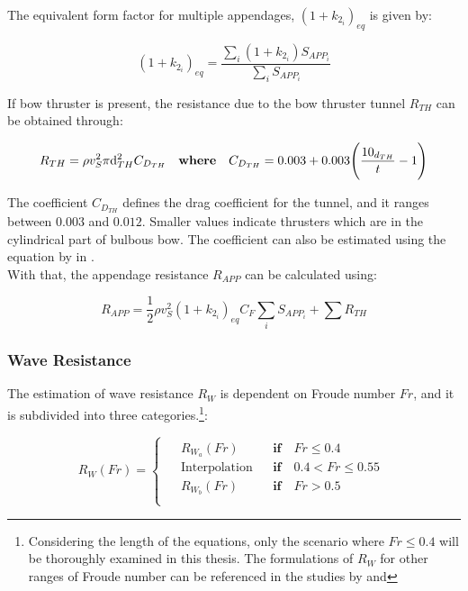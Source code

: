 The equivalent form factor for multiple appendages, $(1+k_{2_i})_{eq}$ is given by:

\begin{equation}\label{eqn:k2eq}
    (1+k_{2_i})_{eq} = \frac{\sum_i(1+k_{2_i})S_{APP_i}}{\sum_iS_{APP_i}}
\end{equation}

If bow thruster is present, the resistance due to the bow thruster tunnel $R_{TH}$ can be obtained through:

\begin{equation}\label{eqn:R_th}
    R_{TH} = \rho v_S^2 \pi \d_{TH}^2 C_{D_{TH}} \quad \textbf{where} \quad C_{D_{TH}} = 0.003 + 0.003 \Biggl( \frac{10_{d_{TH}}}{t} - 1 \Biggr) 
\end{equation}

The coefficient $C_{D_{TH}}$ defines the drag coefficient for the tunnel, and it ranges between $0.003$ and $0.012$. Smaller values indicate thrusters which are in the cylindrical part of bulbous bow. The coefficient can also be estimated using the equation by  in .\\

With that, the appendage resistance $R_{APP}$ can be calculated using:

\begin{equation}\label{R_app}
    R_{APP} = \frac{1}{2}\rho v_S^2 (1+k_{2_i})_{eq} C_F \sum_i S_{APP_i} + \sum R_{TH}
\end{equation}

\subsubsection*{Wave Resistance}

The estimation of wave resistance $R_W$ is dependent on Froude number $Fr$, and it is subdivided into three categories.\footnote{Considering the length of the equations, only the scenario where $Fr \leqslant 0.4$ will be thoroughly examined in this thesis. The formulations of $R_W$ for other ranges of Froude number can be referenced in the studies by  and }:

\begin{equation}
    \label{eqn:case_Rw}
    R_W(Fr) = 
    \begin{cases}
        \begin{aligned}
        &R_{W_a}(Fr) && \textbf{if} \quad Fr \leqslant 0.4 \\
        &\text{Interpolation} && \textbf{if} \quad 0.4 < Fr \leqslant 0.55 \\
        &R_{W_b}(Fr) && \textbf{if} \quad Fr > 0.5 \\
    \end{aligned}
    \end{cases}
\end{equation}


